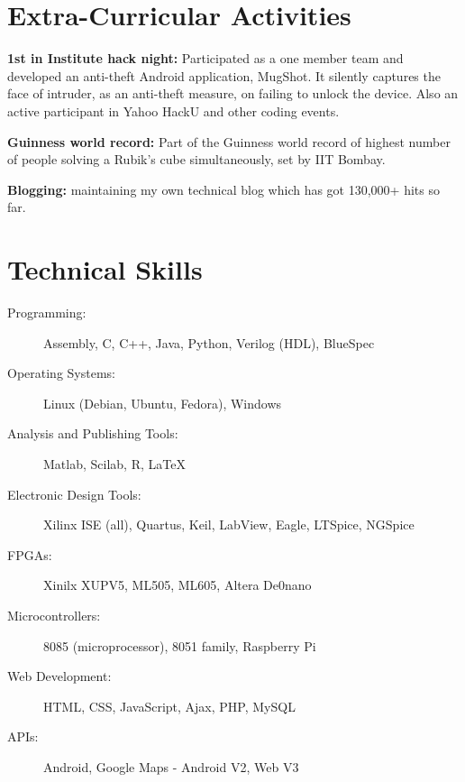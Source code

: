\documentclass[margin,line]{resume}
\begin{document}
\begin{resume}
\section{\mysidestyle Extra-Curricular Activities}
\begin{list1}
\item {\bf 1st in Institute hack night:} Participated as a one member team and developed an anti-theft Android application, MugShot. It silently captures the face of intruder, as an anti-theft measure, on failing to unlock the device. Also an active participant in Yahoo HackU and other coding events.
\item {\bf Guinness world record:} Part of the Guinness world record of highest number of people solving a Rubik’s cube simultaneously, set by IIT Bombay.
\item {\bf Blogging:} maintaining my own technical blog which has got 130,000+ hits so far.
\end{list1}

	

\section{\mysidestyle Technical Skills}
\vspace{0mm}
	\begin{description}
	\item [Programming:] {Assembly, C, C++, Java, Python, Verilog (HDL), BlueSpec}
	\item [Operating Systems:] {Linux (Debian, Ubuntu, Fedora), Windows}
	\item [Analysis and Publishing Tools:] {Matlab, Scilab, R, \LaTeX}
	\item [Electronic Design Tools:] {Xilinx ISE (all), Quartus, Keil, LabView, Eagle, LTSpice, NGSpice}
	\item [FPGAs:] Xinilx XUPV5, ML505, ML605, Altera De0nano
	\item [Microcontrollers:] 8085 (microprocessor), 8051 family, Raspberry Pi
	\item [Web Development:] HTML, CSS, JavaScript, Ajax, PHP, MySQL
	\item [APIs:] Android, Google Maps - Android V2, Web V3
	\end {description}



\end{resume}
\end{document}
